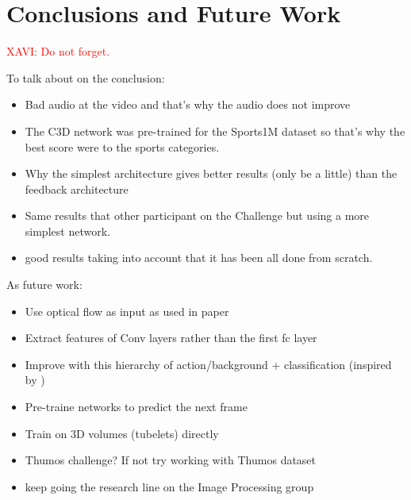 \chapter{Conclusions and Future Work}

\textcolor{red}{XAVI: Do not forget.}

To talk about on the conclusion:
\begin{itemize}
	\item Bad audio at the video and that's why the audio does not improve
    \item The C3D network was pre-trained for the Sports1M dataset so that's why the best score were to the sports categories.
    \item Why the simplest architecture gives better results (only be a little) than the feedback architecture
    \item Same results that other participant on the Challenge but using a more simplest network.
    \item good results taking into account that it has been all done from scratch.
\end{itemize}


As future work:
\begin{itemize}
    \item Use optical flow as input as used in paper \cite{simonyan2014two}\cite{Ng_2015_CVPR}\cite{yao2015describing}
    \item Extract features of Conv layers rather than the first fc layer
    \item Improve with this hierarchy of action/background + classification (inspired by \cite{shoutemporal})
    \item Pre-traine networks to predict the next frame
    \item Train on 3D volumes (tubelets) directly
    \item Thumos challenge? If not try working with Thumos dataset\cite{THUMOS15}
    \item keep going the research line on the Image Processing group

\end{itemize}

